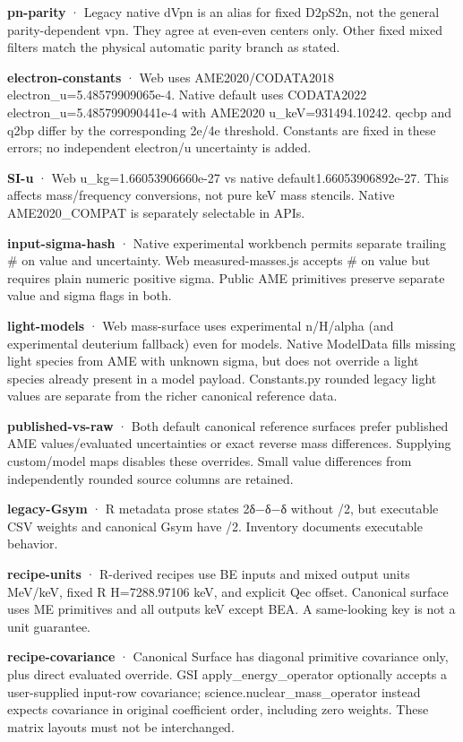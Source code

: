 \documentclass[
  11pt,
  letterpaper,
]{article}
\begin{document}
\textbf{pn-parity} · Legacy native dVpn is an alias for fixed D2pS2n,
not the general parity-dependent vpn. They agree at even-even centers
only. Other fixed mixed filters match the physical automatic parity
branch as stated.

\textbf{electron-constants} · Web uses AME2020/CODATA2018
electron\_u=5.48579909065e-4. Native default uses CODATA2022
electron\_u=5.485799090441e-4 with AME2020 u\_keV=931494.10242. qecbp
and q2bp differ by the corresponding 2e/4e threshold. Constants are
fixed in these errors; no independent electron/u uncertainty is added.

\textbf{SI-u} · Web u\_kg=1.66053906660e-27 vs native
default1.66053906892e-27. This affects mass/frequency conversions, not
pure keV mass stencils. Native AME2020\_COMPAT is separately selectable
in APIs.

\textbf{input-sigma-hash} · Native experimental workbench permits
separate trailing \# on value and uncertainty. Web measured-masses.js
accepts \# on value but requires plain numeric positive sigma. Public
AME primitives preserve separate value and sigma flags in both.

\textbf{light-models} · Web mass-surface uses experimental n/H/alpha
(and experimental deuterium fallback) even for models. Native ModelData
fills missing light species from AME with unknown sigma, but does not
override a light species already present in a model payload.
Constants.py rounded legacy light values are separate from the richer
canonical reference data.

\textbf{published-vs-raw} · Both default canonical reference surfaces
prefer published AME values/evaluated uncertainties or exact reverse
mass differences. Supplying custom/model maps disables these overrides.
Small value differences from independently rounded source columns are
retained.

\textbf{legacy-Gsym} · R metadata prose states 2δ−δ−δ without /2, but
executable CSV weights and canonical Gsym have /2. Inventory documents
executable behavior.

\textbf{recipe-units} · R-derived recipes use BE inputs and mixed output
units MeV/keV, fixed R H=7288.97106 keV, and explicit Qec offset.
Canonical surface uses ME primitives and all outputs keV except BEA. A
same-looking key is not a unit guarantee.

\textbf{recipe-covariance} · Canonical Surface has diagonal primitive
covariance only, plus direct evaluated override. GSI
apply\_energy\_operator optionally accepts a user-supplied input-row
covariance; science.nuclear\_mass\_operator instead expects covariance
in original coefficient order, including zero weights. These matrix
layouts must not be interchanged.
\end{document}
